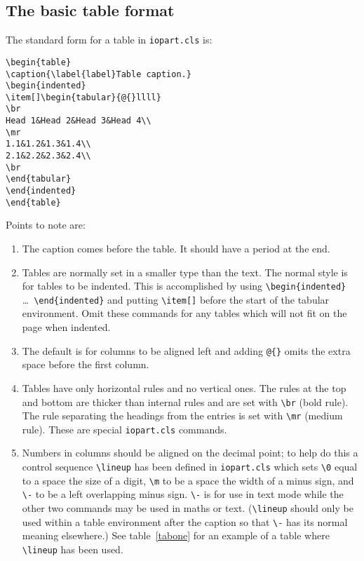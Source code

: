 \documentclass[12pt]{iopart}
\begin{document}
\subsection{The basic table format}
The standard form for a table in \verb"iopart.cls" is:
\small\begin{verbatim}
\begin{table}
\caption{\label{label}Table caption.}
\begin{indented}
\item[]\begin{tabular}{@{}llll}
\br
Head 1&Head 2&Head 3&Head 4\\
\mr
1.1&1.2&1.3&1.4\\
2.1&2.2&2.3&2.4\\
\br
\end{tabular}
\end{indented}
\end{table}
\end{verbatim}\normalsize

\noindent Points to note are:
\begin{enumerate}
\item The caption comes before the table. It should have a period at
the end.

\item Tables are normally set in a smaller type than the text.
The normal style is for tables to be indented. This is accomplished
by using \verb"\begin{indented}" \dots\ \verb"\end{indented}"
and putting \verb"\item[]" before the start of the tabular environment.
Omit these
commands for any tables which will not fit on the page when indented.

\item The default is for columns to be aligned left and
adding \verb"@{}" omits the extra space before the first column.

\item Tables have only horizontal rules and no vertical ones. The rules at
the top and bottom are thicker than internal rules and are set with
\verb"\br" (bold rule).
The rule separating the headings from the entries is set with
\verb"\mr" (medium rule).  These are special \verb"iopart.cls" commands.

\item Numbers in columns should be aligned on the decimal point;
to help do this a control sequence \verb"\lineup" has been defined
in \verb"iopart.cls"
which sets \verb"\0" equal to a space the size of a digit, \verb"\m"
to be a space the width of a minus sign, and \verb"\-" to be a left
overlapping minus sign. \verb"\-" is for use in text mode while the other
two commands may be used in maths or text.
(\verb"\lineup" should only be used within a table
environment after the caption so that \verb"\-" has its normal meaning
elsewhere.) See table~\ref{tabone} for an example of a table where
\verb"\lineup" has been used.
\end{enumerate}
\end{document}
